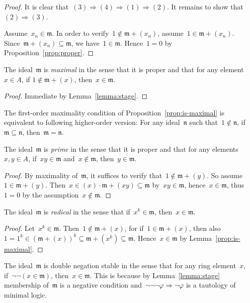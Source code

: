 \documentclass[envcountsect,envcountsame,runningheads]{llncs}
\newcommand{\mmm}{\mathfrak{m}}
\newcommand{\nnn}{\mathfrak{n}}
\renewcommand{\_}{\mathpunct{.}\,}
\begin{document}
\begin{proof}It is clear that~$(3) \Rightarrow (4) \Rightarrow (1) \Rightarrow
(2)$. It remains to show that~$(2) \Rightarrow (3)$.

Assume~$x_n \in \mmm$. In order to verify~$1 \not\in \mmm + (x_n)$,
assume~$1 \in \mmm + (x_n)$. Since~$\mmm + (x_n) \subseteq \mmm$,
we have~$1 \in \mmm$. Hence~$1 = 0$ by Proposition~\ref{prop:proper}.\end{proof}

\begin{proposition}\label{prop:is-maximal}The ideal~$\mmm$ is \emph{maximal} in the sense that it is proper and that for
any element~$x \in A$, if $1 \not\in \mmm + (x)$, then~$x \in \mmm$.\end{proposition}

\begin{proof}Immediate by Lemma~\ref{lemma:stage}.\end{proof}

The first-order maximality condition of Proposition~\ref{prop:is-maximal} is
equivalent to following higher-order version: For any ideal~$\nnn$ such that~$1
\not\in \nnn$, if~$\mmm \subseteq \nnn$, then~$\mmm = \nnn$.

\begin{corollary}The ideal~$\mmm$ is \emph{prime} in the sense that it is proper and that for
any elements~$x,y \in A$, if~$xy \in \mmm$ and~$x \not\in \mmm$, then~$y \in
\mmm$.\end{corollary}

\begin{proof}By maximality of~$\mmm$, it suffices to verify that~$1 \not\in
\mmm + (y)$. So assume~$1 \in \mmm + (y)$. Then~$x \in (x) \cdot \mmm + (xy)
\subseteq \mmm$ by~$xy \in \mmm$, hence~$x \in \mmm$, thus~$1 = 0$ by the assumption~$x \not\in
\mmm$.\end{proof}

\begin{corollary}The ideal~$\mmm$ is \emph{radical} in the sense that if~$x^k \in
\mmm$, then~$x \in \mmm$.\end{corollary}

\begin{proof}Let~$x^k \in \mmm$. Then~$1 \not\in \mmm + (x)$, for if~$1 \in
\mmm + (x)$, then also~$1 = 1^k \in (\mmm + (x))^k \subseteq \mmm + (x^k)
\subseteq \mmm$. Hence~$x \in \mmm$ by Lemma~\ref{prop:is-maximal}.\end{proof}

\begin{remark}The ideal~$\mmm$ is double negation stable in the sense that for any
ring element~$x$, if~$\neg\neg(x \in \mmm)$, then~$x \in \mmm$. This is because
by Lemma~\ref{lemma:stage} membership of~$\mmm$ is a negative condition
and~$\neg\neg\neg\varphi \Rightarrow \neg\varphi$ is a tautology of minimal
logic.\end{remark}
\end{document}
